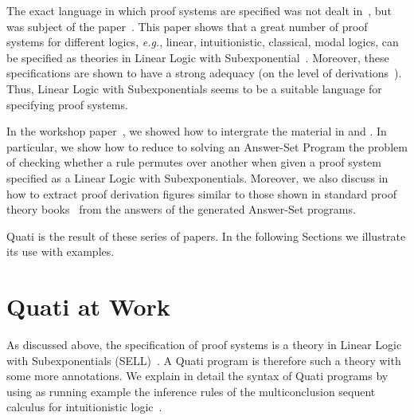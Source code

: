\documentclass{llncs}
\newcommand{\eg}{{\em e.g.}}
\begin{document}
The exact language in which proof systems are specified was not dealt in~\cite{nigam13iclp}, but was subject of 
the paper~\cite{nigam.jlc}. This paper shows that a great number of proof systems for different logics,
\eg, linear, intuitionistic, classical, modal logics, can be specified as theories in Linear Logic with Subexponential~\cite{nigam09ppdp}. Moreover, these specifications are shown to have a strong adequacy (on the level of derivations~\cite{nigam10jar}). Thus, Linear Logic
with Subexponentials seems to be a suitable language for specifying proof systems. 

In the workshop paper~\cite{nigam14ebl}, we showed how to intergrate the material in \cite{nigam13iclp} and \cite{nigam.jlc}.
In particular, we show how to reduce to solving an Answer-Set Program the problem of checking whether a rule permutes over another when given 
a proof system specified as a Linear Logic with Subexponentials. Moreover, we also discuss in \cite{nigam14ebl} how to extract proof derivation 
figures similar to those shown in standard proof theory books~\cite{troelstra} from the 
answers of the generated Answer-Set programs. 

Quati is the result of these series of papers. In the following Sections we illustrate its use 
with examples.

% 

\section{Quati at Work}

As discussed above, the specification of proof systems is a theory in Linear Logic with Subexponentials (SELL)~\cite{nigam09ppdp}. 
A Quati program is therefore such a theory with some more annotations. We explain in detail the syntax of Quati programs 
by using as running example the inference rules of the multiconclusion sequent calculus for intuitionistic logic~\cite{maehara}.

\end{document}
